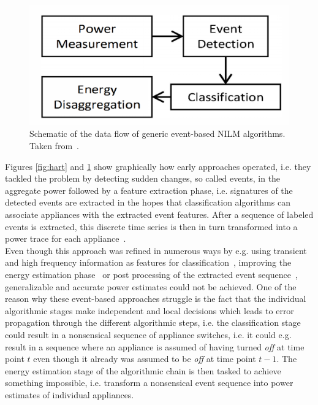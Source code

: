 \documentclass[11pt]{cmuthesis} %
\begin{document}
\begin{figure}
    \centering
    \includegraphics[width=0.65\linewidth]{nilm_event.png}
    \caption[Schematic of the data flow of generic event-based NILM algorithms.]{Schematic of the data flow of generic event-based NILM algorithms. Taken from~\cite{anderson2012event}.}
    \label{fig:hart2}
\end{figure}


 Figures \ref{fig:hart} and \ref{fig:hart2} show graphically how early approaches operated, i.e. they tackled the problem by detecting sudden changes, so called events, in the aggregate power followed by a feature extraction phase, i.e. signatures of the detected events are extracted in the hopes that classification algorithms can associate appliances with the extracted event features. After a sequence of labeled events is extracted, this discrete time series is then in turn transformed into a power trace for each appliance~\cite{zoha2012non,zeifman2011nonintrusive}.\\
Even though this approach was refined in numerous ways by e.g. using transient and high frequency information as features for classification~\cite{norford1996non}, improving the energy estimation phase~\cite{giri2015energy} or post processing of the extracted event sequence~\cite{he2016non}, generalizable and accurate power estimates could not be achieved. One of the reason why these event-based approaches struggle is the fact that the individual algorithmic stages make independent and local decisions which leads to error propagation through the different algorithmic steps, i.e. the classification stage could result in a nonsensical sequence of appliance switches, i.e. it could e.g. result in a sequence where an appliance is assumed of having turned \emph{off} at time point $t$ even though it already was assumed to be \emph{off} at time point $t-1$. The energy estimation stage of the algorithmic chain is then tasked to achieve something impossible, i.e. transform a nonsensical event sequence into power estimates of individual appliances.
\end{document}
